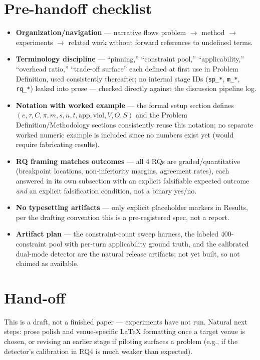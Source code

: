 \documentclass[11pt]{article}
\begin{document}
\section*{Pre-handoff checklist}
\begin{itemize}[leftmargin=1.4em]
\item \textbf{Organization/navigation} --- narrative flows problem $\to$ method $\to$ experiments $\to$ related work without forward references to undefined terms.
\item \textbf{Terminology discipline} --- ``pinning,'' ``constraint pool,'' ``applicability,'' ``overhead ratio,'' ``trade-off surface'' each defined at first use in Problem Definition, used consistently thereafter; no internal stage IDs (\texttt{sp\_*}, \texttt{m\_*}, \texttt{rq\_*}) leaked into prose --- checked directly against the discussion pipeline log.
\item \textbf{Notation with worked example} --- the formal setup section defines $(e, \tau, C, \pi, m, s, n, t, \mathrm{app}, \mathrm{viol}, V, O, S)$ and the Problem Definition/Methodology sections consistently reuse this notation; no separate worked numeric example is included since no numbers exist yet (would require fabricating results).
\item \textbf{RQ framing matches outcomes} --- all 4 RQs are graded/quantitative (breakpoint locations, non-inferiority margins, agreement rates), each answered in its own subsection with an explicit falsifiable expected outcome \emph{and} an explicit falsification condition, not a binary yes/no.
\item \textbf{No typesetting artifacts} --- only explicit placeholder markers in Results, per the drafting convention this is a pre-registered spec, not a report.
\item \textbf{Artifact plan} --- the constraint-count sweep harness, the labeled 400-constraint pool with per-turn applicability ground truth, and the calibrated dual-mode detector are the natural release artifacts; not yet built, so not claimed as available.
\end{itemize}

\section*{Hand-off}
This is a draft, not a finished paper --- experiments have not run. Natural next steps: prose polish and venue-specific LaTeX formatting once a target venue is chosen, or revising an earlier stage if piloting surfaces a problem (e.g., if the detector's calibration in RQ4 is much weaker than expected).
\end{document}
